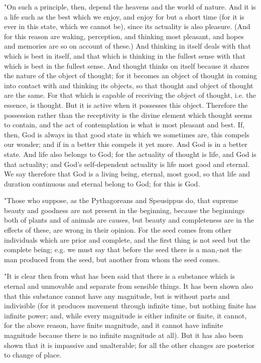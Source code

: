 "On such a principle, then, depend the heavens and the world of nature.
And it is a life such as the best which we enjoy, and enjoy for but
a short time (for it is ever in this state, which we cannot be), since
its actuality is also pleasure. (And for this reason are waking, perception,
and thinking most pleasant, and hopes and memories are so on account
of these.) And thinking in itself deals with that which is best in
itself, and that which is thinking in the fullest sense with that
which is best in the fullest sense. And thought thinks on itself because
it shares the nature of the object of thought; for it becomes an object
of thought in coming into contact with and thinking its objects, so
that thought and object of thought are the same. For that which is
capable of receiving the object of thought, i.e. the essence, is thought.
But it is active when it possesses this object. Therefore the possession
rather than the receptivity is the divine element which thought seems
to contain, and the act of contemplation is what is most pleasant
and best. If, then, God is always in that good state in which we sometimes
are, this compels our wonder; and if in a better this compels it yet
more. And God is in a better state. And life also belongs to God;
for the actuality of thought is life, and God is that actuality; and
God's self-dependent actuality is life most good and eternal. We say
therefore that God is a living being, eternal, most good, so that
life and duration continuous and eternal belong to God; for this is
God. 

"Those who suppose, as the Pythagoreans and Speusippus do, that supreme
beauty and goodness are not present in the beginning, because the
beginnings both of plants and of animals are causes, but beauty and
completeness are in the effects of these, are wrong in their opinion.
For the seed comes from other individuals which are prior and complete,
and the first thing is not seed but the complete being; e.g. we must
say that before the seed there is a man,-not the man produced from
the seed, but another from whom the seed comes. 

"It is clear then from what has been said that there is a substance
which is eternal and unmovable and separate from sensible things.
It has been shown also that this substance cannot have any magnitude,
but is without parts and indivisible (for it produces movement through
infinite time, but nothing finite has infinite power; and, while every
magnitude is either infinite or finite, it cannot, for the above reason,
have finite magnitude, and it cannot have infinite magnitude because
there is no infinite magnitude at all). But it has also been shown
that it is impassive and unalterable; for all the other changes are
posterior to change of place. 

